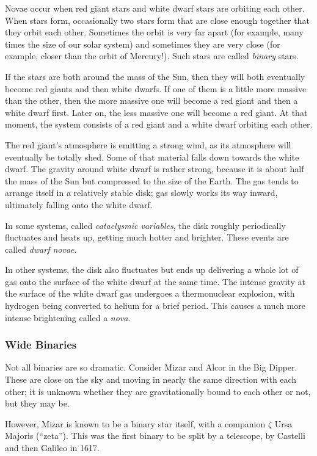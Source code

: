 \documentclass[12pt, preprint]{aastex}
\begin{document}
Novae occur when red giant stars and white dwarf stars are orbiting
each other. When stars form, occasionally two stars form that are
close enough together that they orbit each other. Sometimes the orbit
is very far apart (for example, many times the size of our solar
system) and sometimes they are very close (for example, closer than
the orbit of Mercury!). Such stars are called {\it binary} stars.

If the stars are both around the mass of the Sun, then they will both
eventually become red giants and then white dwarfs. If one of them is
a little more massive than the other, then the more massive one will
become a red giant and then a white dwarf first. Later on, the less
massive one will become a red giant. At that moment, the system
consists of a red giant and a white dwarf orbiting each other.

The red giant's atmosphere is emitting a strong wind, as its
atmosphere will eventually be totally shed. Some of that material
falls down towards the white dwarf. The gravity around white dwarf is
rather strong, because it is about half the mass of the Sun but
compressed to the size of the Earth. The gas tends to arrange itself
in a relatively stable disk; gas slowly works its way inward,
ultimately falling onto the white dwarf.

In some systems, called {\it cataclysmic  variables}, the disk roughly
periodically fluctuates and heats up, getting much hotter and
brighter. These events are called {\it dwarf novae}.

In other systems, the disk also fluctuates but ends up delivering a
whole lot of gas onto the surface of the white dwarf at the same
time. The intense gravity at the surface of the white dwarf gas
undergoes a thermonuclear explosion, with hydrogen being converted to
helium for a brief period. This causes a much more intense brightening
called a {\it nova}.

\subsubsection{Wide Binaries}

Not all binaries are so dramatic. Consider Mizar and Alcor in the Big
Dipper. These are close on the sky and moving in nearly the same
direction with each other; it is unknown whether they are
gravitationally bound to each other or not, but they may be.

However, Mizar is known to be a binary star itself, with a companion
$\zeta$ Ursa Majoris (``zeta''). This was the first binary to be split
by a telescope, by Castelli and then Galileo in 1617.
\end{document}
